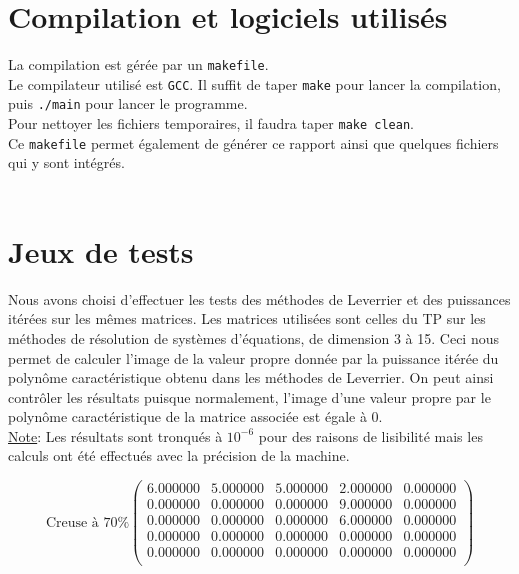 \documentclass{report}
\begin{document}
    \section{Compilation et logiciels utilisés}
      \noindent La compilation est gérée par un \verb"makefile".\\
      Le compilateur utilisé est \verb"GCC".
      Il suffit de taper \verb"make" pour lancer la compilation, puis \verb"./main" pour lancer le programme.\\
      Pour nettoyer les fichiers temporaires, il faudra taper \verb"make clean".\\
      Ce \verb"makefile" permet également de générer ce rapport ainsi que quelques fichiers qui y sont intégrés.\\ \\
      
    \section{Jeux de tests}
      Nous avons choisi d'effectuer les tests des méthodes de Leverrier et des puissances itérées sur les mêmes matrices. Les matrices utilisées sont celles du TP sur les méthodes de résolution de systèmes d'équations, de dimension 3 à 15. Ceci nous permet de calculer l'image de la valeur propre donnée par la puissance itérée du polynôme caractéristique obtenu dans les méthodes de Leverrier. On peut ainsi contrôler les résultats puisque normalement, l'image d'une valeur propre par le polynôme caractéristique de la matrice associée est égale à 0. \\
      
      \underline{Note}: Les résultats sont tronqués à $10^{-6}$ pour des raisons de lisibilité mais les calculs ont été effectués avec la précision de la machine.
      
      \begin{equation}
	\textrm{Creuse à 70\%}
	\begin{pmatrix}
	  6.000000 & 5.000000 & 5.000000 & 2.000000 & 0.000000 \\ 
	  0.000000 & 0.000000 & 0.000000 & 9.000000 & 0.000000 \\ 
	  0.000000 & 0.000000 & 0.000000 & 6.000000 & 0.000000 \\ 
	  0.000000 & 0.000000 & 0.000000 & 0.000000 & 0.000000 \\ 
	  0.000000 & 0.000000 & 0.000000 & 0.000000 & 0.000000 \\ 
	\end{pmatrix}
	\label{syst1}
      \end{equation}
	
\end{document}
